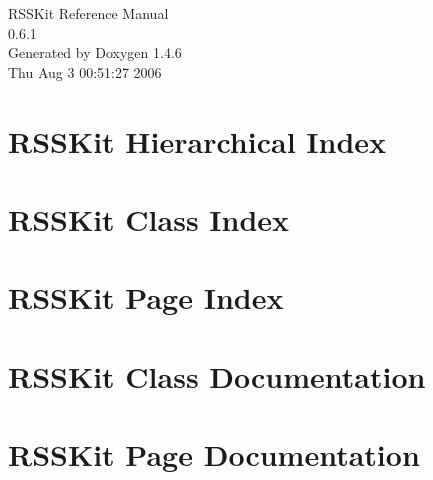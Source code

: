 \documentclass[a4paper]{book}
\begin{document}
\begin{titlepage}
\vspace*{7cm}
\begin{center}
{\Large RSSKit Reference Manual\\[1ex]\large 0.6.1 }\\
\vspace*{1cm}
{\large Generated by Doxygen 1.4.6}\\
\vspace*{0.5cm}
{\small Thu Aug 3 00:51:27 2006}\\
\end{center}
\end{titlepage}
\clearemptydoublepage
{}
\tableofcontents
\clearemptydoublepage
{}
\chapter{RSSKit Hierarchical Index}

\chapter{RSSKit Class Index}

\chapter{RSSKit Page Index}

\chapter{RSSKit Class Documentation}





\chapter{RSSKit Page Documentation}

\printindex
\end{document}
